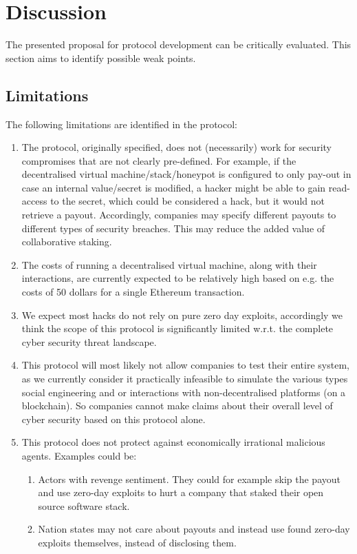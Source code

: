 \section{Discussion}
\label{sec:discussion}
The presented proposal for protocol development can be critically evaluated. This section aims to identify possible weak points.
\subsection{Limitations}
The following limitations are identified in the protocol:
\begin{enumerate}
    \item The protocol, originally specified, does not (necessarily) work for security compromises that are not clearly pre-defined. For example, if the decentralised virtual machine/stack/honeypot is configured to only pay-out in case an internal value/secret is modified, a hacker might be able to gain read-access to the secret, which could be considered a hack, but it would not retrieve a payout. Accordingly, companies may specify different payouts to different types of security breaches. This may reduce the added value of collaborative staking.
    \item The costs of running a decentralised virtual machine, along with their interactions, are currently expected to be relatively high based on e.g. the costs of 50 dollars for a single Ethereum transaction.
    \item We expect most hacks do not rely on pure zero day exploits, accordingly we think the scope of this protocol is significantly limited w.r.t. the complete cyber security threat landscape.
    \item This protocol will most likely not allow companies to test their entire system, as we currently consider it practically infeasible to simulate the various types social engineering and or interactions with non-decentralised platforms (on a blockchain). So companies cannot make claims about their overall level of cyber security based on this protocol alone.
    \item This protocol does not protect against economically irrational malicious agents. Examples could be:
    \begin{enumerate}
        \item Actors with revenge sentiment. They could for example skip the payout and use zero-day exploits to hurt a company that staked their open source software stack.
        \item Nation states may not care about payouts and instead use found zero-day exploits themselves, instead of disclosing them.
    \end{enumerate}
\end{enumerate}


